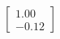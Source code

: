 \documentclass[preview]{standalone}
\begin{document}
\begin{align*}
\begin{bmatrix} 1.00 \\ -0.12 \end{bmatrix}
\end{align*}
\end{document}
